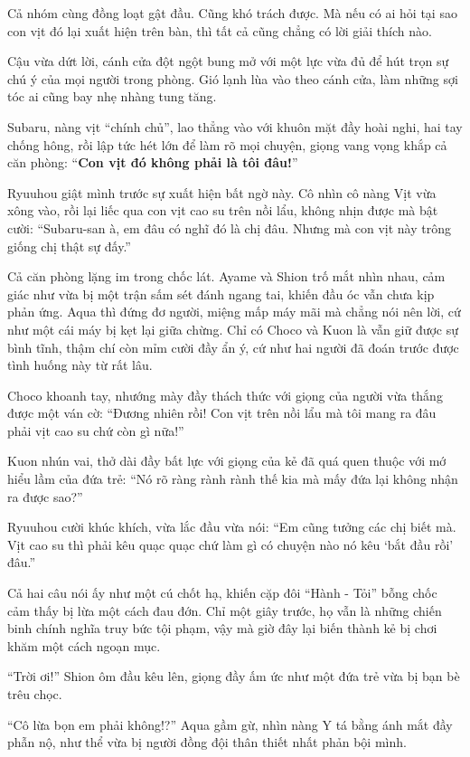 \documentclass[../main.tex]{subfiles}
\begin{document}
Cả nhóm cùng đồng loạt gật đầu. Cũng khó trách được. Mà nếu có ai hỏi tại sao con vịt đó lại xuất hiện trên bàn, thì tất cả cũng chẳng có lời giải thích nào.

Cậu vừa dứt lời, cánh cửa đột ngột bung mở với một lực vừa đủ để hút trọn sự chú ý của mọi người trong phòng. Gió lạnh lùa vào theo cánh cửa, làm những sợi tóc ai cũng bay nhẹ nhàng tung tăng.

Subaru, nàng vịt ``chính chủ'', lao thẳng vào với khuôn mặt đầy hoài nghi, hai tay chống hông, rồi lập tức hét lớn để làm rõ mọi chuyện, giọng vang vọng khắp cả căn phòng: ``\textbf{Con vịt đó không phải là tôi đâu!}''

Ryuuhou giật mình trước sự xuất hiện bất ngờ này. Cô nhìn cô nàng Vịt vừa xông vào, rồi lại liếc qua con vịt cao su trên nồi lẩu, không nhịn được mà bật cười: ``Subaru-san à, em đâu có nghĩ đó là chị đâu. Nhưng mà con vịt này trông giống chị thật sự đấy.''

Cả căn phòng lặng im trong chốc lát. Ayame và Shion trố mắt nhìn nhau, cảm giác như vừa bị một trận sấm sét đánh ngang tai, khiến đầu óc vẫn chưa kịp phản ứng. Aqua thì đứng đơ người, miệng mấp máy mãi mà chẳng nói nên lời, cứ như một cái máy bị kẹt lại giữa chừng. Chỉ có Choco và Kuon là vẫn giữ được sự bình tĩnh, thậm chí còn mỉm cười đầy ẩn ý, cứ như hai người đã đoán trước được tình huống này từ rất lâu.

Choco khoanh tay, nhướng mày đầy thách thức với giọng của người vừa thắng được một ván cờ: ``Đương nhiên rồi! Con vịt trên nồi lẩu mà tôi mang ra đâu phải vịt cao su chứ còn gì nữa!''

Kuon nhún vai, thở dài đầy bất lực với giọng của kẻ đã quá quen thuộc với mớ hiểu lầm của đứa trẻ: ``Nó rõ ràng rành rành thế kia mà mấy đứa lại không nhận ra được sao?''

Ryuuhou cười khúc khích, vừa lắc đầu vừa nói: ``Em cũng tưởng các chị biết mà. Vịt cao su thì phải kêu quạc quạc chứ làm gì có chuyện nào nó kêu `bắt đầu rồi' đâu.''

Cả hai câu nói ấy như một cú chốt hạ, khiến cặp đôi ``Hành - Tỏi'' bỗng chốc cảm thấy bị lừa một cách đau đớn. Chỉ một giây trước, họ vẫn là những chiến binh chính nghĩa truy bức tội phạm, vậy mà giờ đây lại biến thành kẻ bị chơi khăm một cách ngoạn mục.

``Trời ơi!'' Shion ôm đầu kêu lên, giọng đầy ấm ức như một đứa trẻ vừa bị bạn bè trêu chọc.

``Cô lừa bọn em phải không!?'' Aqua gầm gừ, nhìn nàng Y tá bằng ánh mắt đầy phẫn nộ, như thể vừa bị người đồng đội thân thiết nhất phản bội mình.
\end{document}
